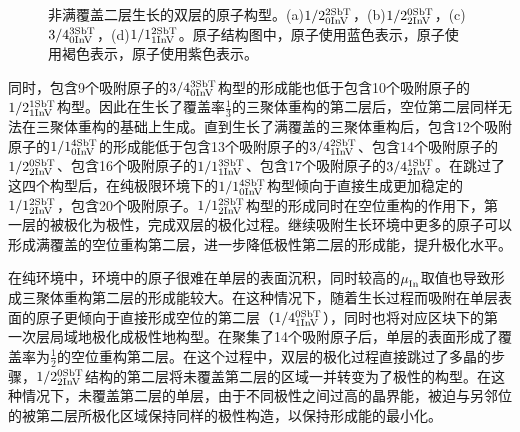 \begin{figure}[htb]
{        \label{fig:IS_structure_partical_3-4_0-3}
    }
    \caption{非满覆盖二层生长的双层的原子构型。(a)$\rm 1/2{}_{0InV}^{2SbT} \it$，(b)$\rm 1/2{}_{2InV}^{0SbT} \it$，(c)$\rm 3/4{}_{0InV}^{3SbT} \it$，(d)$\rm 1/1{}_{1InV}^{2SbT} \it$。原子结构图中，原子使用蓝色表示，原子使用褐色表示，原子使用紫色表示。}
    \label{fig:IS_structure_partical_1}
\end{figure}

同时，包含9个吸附原子的$\rm 3/4{}_{0InV}^{3SbT} \it$构型的形成能也低于包含10个吸附原子的$\rm 1/2{}_{1InV}^{1SbT} \it$构型。因此在生长了覆盖率$\frac{1}{3}$的三聚体重构的第二层后，空位第二层同样无法在三聚体重构的基础上生成。直到生长了满覆盖的三聚体重构后，包含12个吸附原子的$\rm 1/1{}_{0InV}^{4SbT} \it$的形成能低于包含13个吸附原子的$\rm 3/4{}_{1InV}^{2SbT} \it$、包含14个吸附原子的$\rm 1/2{}_{2InV}^{0SbT} \it$、包含16个吸附原子的$\rm 1/1{}_{1InV}^{3SbT} \it$、包含17个吸附原子的$\rm 3/4{}_{2InV}^{1SbT} \it$。在跳过了这四个构型后，在纯极限环境下的$\rm 1/1{}_{0InV}^{4SbT} \it$构型倾向于直接生成更加稳定的$\rm 1/1{}_{2InV}^{2SbT} \it$，包含20个吸附原子。$\rm 1/1{}_{2InV}^{2SbT} \it$构型的形成同时在空位重构的作用下，第一层的被极化为极性，完成双层的极化过程。继续吸附生长环境中更多的原子可以形成满覆盖的空位重构第二层，进一步降低极性第二层的形成能，提升极化水平。

在纯环境中，环境中的原子很难在单层的表面沉积，同时较高的$\it \mu_{\rm In}^{\rm } \it$取值也导致形成三聚体重构第二层的形成能较大。在这种情况下，随着生长过程而吸附在单层表面的原子更倾向于直接形成空位的第二层（$\rm 1/4{}_{1InV}^{0SbT} \it$），同时也将对应区块下的第一次层局域地极化成极性地构型。在聚集了14个吸附原子后，单层的表面形成了覆盖率为$\frac{1}{2}$的空位重构第二层。在这个过程中，双层的极化过程直接跳过了多晶的步骤，$\rm 1/2{}_{2InV}^{0SbT} \it$结构的第二层将未覆盖第二层的区域一并转变为了极性的构型。在这种情况下，未覆盖第二层的单层，由于不同极性之间过高的晶界能，被迫与另邻位的被第二层所极化区域保持同样的极性构造，以保持形成能的最小化。

